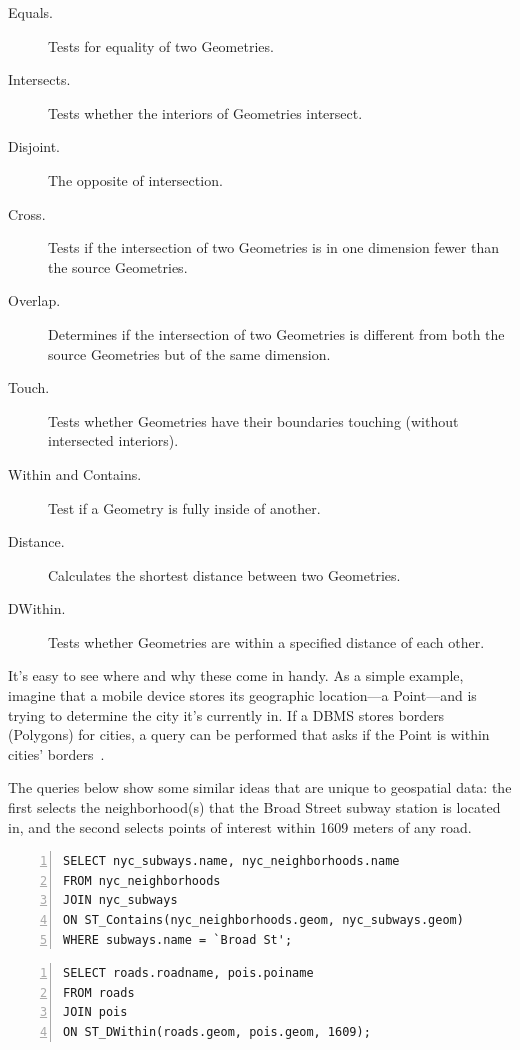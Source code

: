 \begin{description}
  \item[Equals.] Tests for equality of two Geometries.
  \item[Intersects.] Tests whether the interiors of Geometries intersect.
  \item[Disjoint.] The opposite of intersection.
  \item[Cross.] Tests if the intersection of two Geometries is in one dimension fewer than the source Geometries.
  \item[Overlap.] Determines if the intersection of two Geometries is different from both the source Geometries but of the same dimension.
  \item[Touch.] Tests whether Geometries have their boundaries touching (without intersected interiors).
  \item[Within and Contains.] Test if a Geometry is fully inside of another.
  \item[Distance.] Calculates the shortest distance between two Geometries.
  \item[DWithin.] Tests whether Geometries are within a specified distance of each other.
\end{description}

It's easy to see where and why these come in handy. As a simple example, imagine that a mobile device stores its geographic location---a Point---and is trying to determine the city it's currently in. If a DBMS stores borders (Polygons) for cities, a query can be performed that asks if the Point is within cities' borders~\cite{Boundless}.

The queries below show some similar ideas that are unique to geospatial data: the first selects the neighborhood(s) that the Broad Street subway station is located in, and the second selects points of interest within 1609 meters of any road.

\begin{Verbatim}[samepage=true,baselinestretch=1,numbers=left,xleftmargin=12mm]
SELECT nyc_subways.name, nyc_neighborhoods.name
FROM nyc_neighborhoods
JOIN nyc_subways
ON ST_Contains(nyc_neighborhoods.geom, nyc_subways.geom)
WHERE subways.name = `Broad St';
\end{Verbatim}

\begin{Verbatim}[samepage=true,baselinestretch=1,numbers=left,xleftmargin=12mm]
SELECT roads.roadname, pois.poiname
FROM roads
JOIN pois 
ON ST_DWithin(roads.geom, pois.geom, 1609);
\end{Verbatim}

